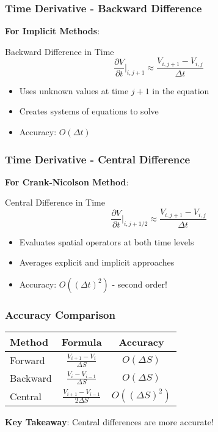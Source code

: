\documentclass[aspectratio=169]{beamer}
\begin{document}
\begin{frame}
\frametitle{Time Derivative - Backward Difference}
\textbf{For Implicit Methods}:

\begin{block}{Backward Difference in Time}
\[\frac{\partial V}{\partial t} \bigg|_{i,j+1} \approx \frac{V_{i,j+1} - V_{i,j}}{\Delta t}\]
\end{block}

\begin{itemize}
\item Uses unknown values at time \(j+1\) in the equation
\item Creates systems of equations to solve
\item Accuracy: \(O(\Delta t)\)
\end{itemize}
\end{frame}

\begin{frame}
\frametitle{Time Derivative - Central Difference}
\textbf{For Crank-Nicolson Method}:

\begin{block}{Central Difference in Time}
\[\frac{\partial V}{\partial t} \bigg|_{i,j+1/2} \approx \frac{V_{i,j+1} - V_{i,j}}{\Delta t}\]
\end{block}

\begin{itemize}
\item Evaluates spatial operators at both time levels
\item Averages explicit and implicit approaches
\item Accuracy: \(O((\Delta t)^2)\) - second order!
\end{itemize}
\end{frame}

\begin{frame}
\frametitle{Accuracy Comparison}
\begin{center}
\begin{tabular}{lcc}
\toprule
\textbf{Method} & \textbf{Formula} & \textbf{Accuracy} \\
\midrule
Forward & \(\frac{V_{i+1} - V_i}{\Delta S}\) & \(O(\Delta S)\) \\
Backward & \(\frac{V_i - V_{i-1}}{\Delta S}\) & \(O(\Delta S)\) \\
Central & \(\frac{V_{i+1} - V_{i-1}}{2\Delta S}\) & \(O((\Delta S)^2)\) \\
\bottomrule
\end{tabular}
\end{center}

\textbf{Key Takeaway}: Central differences are more accurate!
\end{frame}
\end{document}
